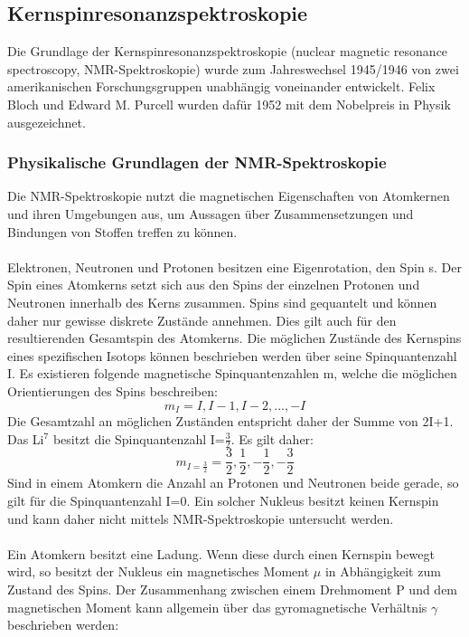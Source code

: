 \documentclass[a4paper, 11pt, headsepline,footsepline,twoside,abstract]{scrbook}
\begin{document}
\subsection{Kernspinresonanzspektroskopie}
Die Grundlage der Kernspinresonanzspektroskopie (nuclear magnetic resonance spectroscopy, NMR-Spektroskopie) wurde zum Jahreswechsel 1945/1946 von zwei amerikanischen Forschungsgruppen unabhängig voneinander entwickelt. Felix Bloch und Edward M. Purcell wurden dafür 1952 mit dem Nobelpreis in Physik ausgezeichnet.
\subsubsection{Physikalische Grundlagen der NMR-Spektroskopie}
Die NMR-Spektroskopie nutzt die magnetischen Eigenschaften von Atomkernen und ihren Umgebungen aus, um Aussagen über Zusammensetzungen und Bindungen von Stoffen treffen zu können.
\\\\
Elektronen, Neutronen und Protonen besitzen eine Eigenrotation, den Spin s. Der Spin eines Atomkerns setzt sich aus den Spins der einzelnen Protonen und Neutronen innerhalb des Kerns zusammen. Spins sind gequantelt und können daher nur gewisse diskrete Zustände annehmen. Dies gilt auch für den resultierenden Gesamtspin des Atomkerns. Die möglichen Zustände des Kernspins eines spezifischen Isotops können beschrieben werden über seine Spinquantenzahl I. Es existieren folgende magnetische Spinquantenzahlen m, welche die möglichen Orientierungen des Spins beschreiben:
\begin{equation}
m_I = I, I-1, I-2, ..., -I
\end{equation}
Die Gesamtzahl an möglichen Zuständen entspricht daher der Summe von 2I+1. Das Li$^7$ besitzt die Spinquantenzahl I=$\frac{3}{2}$. Es gilt daher:
\begin{equation}
m_{I=\frac{3}{2}} = \frac{3}{2}, \frac{1}{2}, -\frac{1}{2}, -\frac{3}{2}
\end{equation}
Sind in einem Atomkern die Anzahl an Protonen und Neutronen beide gerade, so gilt für die Spinquantenzahl I=0. Ein solcher Nukleus besitzt keinen Kernspin und kann daher nicht mittels NMR-Spektroskopie untersucht werden.
\\\\
Ein Atomkern besitzt eine Ladung. Wenn diese durch einen Kernspin bewegt wird, so besitzt der Nukleus ein magnetisches Moment $\mu$ in Abhängigkeit zum Zustand des Spins. Der Zusammenhang zwischen einem Drehmoment P und dem magnetischen Moment kann allgemein über das gyromagnetische Verhältnis $\gamma$ beschrieben werden: 
\end{document}
